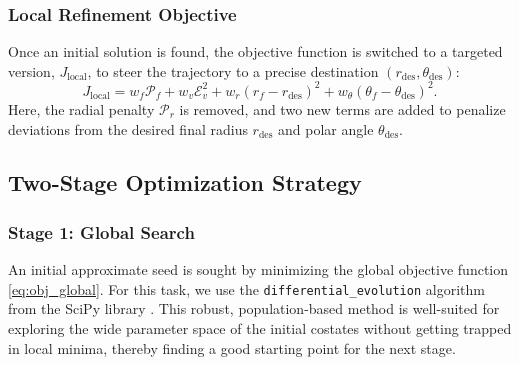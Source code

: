 \documentclass[journal,a4paper]{IEEEtran}
\begin{document}
\subsubsection{Local Refinement Objective}
Once an initial solution is found, the objective function is switched to a targeted version, $J_\text{local}$, to steer the trajectory to a precise destination $(r_\text{des}, \theta_\text{des})$:\
\begin{equation}
    J_\text{local} = w_f \mathcal{P}_f + w_v \mathcal{E}_v^2 + w_r (r_f - r_\text{des})^2 + w_\theta (\theta_f - \theta_\text{des})^2.
    \label{eq:obj_local}
\end{equation}
Here, the radial penalty $\mathcal{P}_r$ is removed, and two new terms are added to penalize deviations from the desired final radius $r_\text{des}$ and polar angle $\theta_\text{des}$.

\subsection{Two-Stage Optimization Strategy}
\subsubsection{Stage 1: Global Search}
An initial approximate seed is sought by minimizing the global objective function \eqref{eq:obj_global}. For this task, we use the \texttt{differential\_evolution} algorithm from the SciPy library \cite{Storn1997}. This robust, population-based method is well-suited for exploring the wide parameter space of the initial costates without getting trapped in local minima, thereby finding a good starting point for the next stage.
\end{document}
